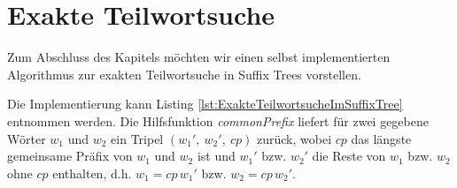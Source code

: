 \documentclass[12pt]{report}
\begin{document}
\section{Exakte Teilwortsuche}
\label{sec:ExakteTeilwortsuche}

Zum Abschluss des Kapitels möchten wir einen selbst implementierten Algorithmus zur exakten Teilwortsuche in Suffix Trees vorstellen.

Die Implementierung kann Listing \ref{lst:ExakteTeilwortsucheImSuffixTree} entnommen werden.
Die Hilfsfunktion \textit{commonPrefix} liefert für zwei gegebene Wörter $w_1$ und $w_2$ ein Tripel $(w_1',\: w_2',\: cp)$ zurück, wobei $cp$ das längste gemeinsame Präfix von $w_1$ und $w_2$ ist und $w_1'$ bzw. $w_2'$ die Reste von $w_1$ bzw. $w_2$ ohne $cp$ enthalten, d.h. $w_1 = cp \, w_1'$ bzw. $w_2 = cp \, w_2' $.
\end{document}
